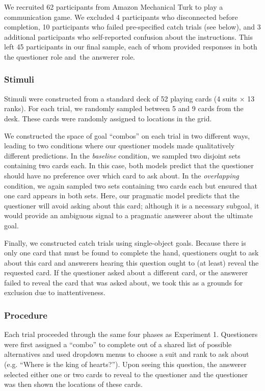 \documentclass[12pt, floatsintext, jou]{apa6}
\begin{document}
We recruited 62 participants from Amazon Mechanical Turk to play a communication game.
We excluded 4 participants who disconnected before completion, 10 participants who failed pre-specified catch trials (see below), and 3 additional participants who self-reported confusion about the instructions.
This left 45 participants in our final sample, each of whom provided responses in both the questioner role and the answerer role.

\subsubsection{Stimuli}

Stimuli were constructed from a standard deck of 52 playing cards (4 suits $\times$ 13 ranks). 
For each trial, we randomly sampled between 5 and 9 cards from the desk. 
These cards were randomly assigned to locations in the grid. 

We constructed the space of goal ``combos'' on each trial in two different ways, leading to two conditions where our questioner models made qualitatively different predictions.
In the \emph{baseline} condition, we sampled two disjoint sets containing two cards each. 
In this case, both models predict that the questioner should have no preference over which card to ask about.
In the \emph{overlapping} condition, we again sampled two sets containing two cards each but ensured that one card appears in both sets. 
Here, our pragmatic model predicts that the questioner will avoid asking about this card; although it is a necessary subgoal, it would provide an ambiguous signal to a pragmatic answerer about the ultimate goal.

Finally, we constructed catch trials using single-object goals. 
Because there is only one card that must be found to complete the hand, questioners ought to ask about this card and answerers hearing this question ought to (at least) reveal the requested card.
If the questioner asked about a different card, or the answerer failed to reveal the card that was asked about, we took this as a grounds for exclusion due to inattentiveness.

\subsubsection{Procedure}

Each trial proceeded through the same four phases as Experiment 1. 
Questioners were first assigned a ``combo'' to complete out of a shared list of possible alternatives and used dropdown menus to choose a suit and rank to ask about (e.g. ``Where is the king of hearts?'').
Upon seeing this question, the answerer selected either one or two cards to reveal to the questioner and the questioner was then shown the locations of these cards.
\end{document}
